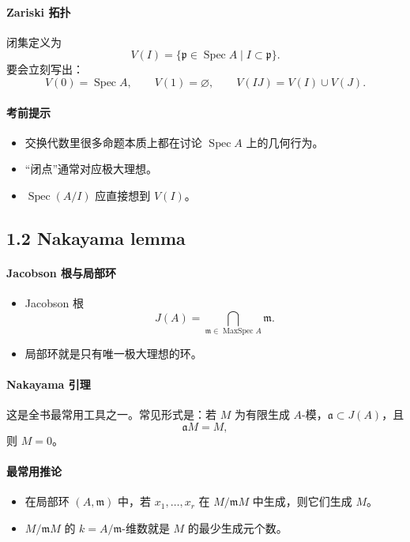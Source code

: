 \documentclass[a4paper]{ctexart}
\begin{document}
\paragraph{Zariski 拓扑}
闭集定义为
\[
V(I)=\{\mathfrak p\in \operatorname{Spec}A\mid I\subset \mathfrak p\}.
\]
要会立刻写出：
\[
V(0)=\operatorname{Spec}A,\qquad V(1)=\varnothing,\qquad
V(IJ)=V(I)\cup V(J).
\]

\paragraph{考前提示}
\begin{itemize}
  \item 交换代数里很多命题本质上都在讨论 \(\operatorname{Spec}A\) 上的几何行为。
  \item “闭点”通常对应极大理想。
  \item \(\operatorname{Spec}(A/I)\) 应直接想到 \(V(I)\)。
\end{itemize}

\subsection{1.2 Nakayama lemma}

\paragraph{Jacobson 根与局部环}
\begin{itemize}
  \item Jacobson 根
  \[
    J(A)=\bigcap_{\mathfrak m\in \operatorname{MaxSpec}A}\mathfrak m.
  \]
  \item 局部环就是只有唯一极大理想的环。
\end{itemize}

\paragraph{Nakayama 引理}
这是全书最常用工具之一。常见形式是：若 \(M\) 为有限生成 \(A\)-模，\(\mathfrak a\subset J(A)\)，且
\[
\mathfrak aM=M,
\]
则 \(M=0\)。

\paragraph{最常用推论}
\begin{itemize}
  \item 在局部环 \((A,\mathfrak m)\) 中，若 \(x_1,\dots,x_r\) 在 \(M/\mathfrak mM\) 中生成，则它们生成 \(M\)。
  \item \(M/\mathfrak mM\) 的 \(k=A/\mathfrak m\)-维数就是 \(M\) 的最少生成元个数。
\end{itemize}
\end{document}
